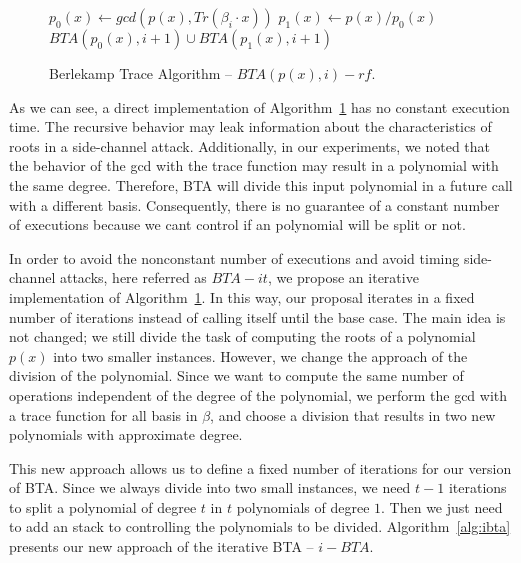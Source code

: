 \begin{figure}[ht]
\begin{algorithm}[H]
    $p_{0}(x) \gets gcd(p(x), Tr(\beta_{i}\cdot x))$\;
    $p_{1}(x) \gets p(x) / p_{0}(x)$ \;
\Return $BTA(p_{0}(x), i + 1) \cup BTA(p_{1}(x), i + 1)$\;
 \caption{Berlekamp Trace Algorithm -- $BTA(p(x), i)-rf$.}
  \label{alg:bta}
\end{algorithm}
\end{figure}

As we can see, a direct implementation of Algorithm~\ref{alg:bta} has no constant execution time. The recursive behavior may leak information about the characteristics of roots in a side-channel attack. Additionally, in our experiments, we noted that the behavior of the gcd with the trace function may result in a polynomial with the same degree. Therefore, BTA will divide this input polynomial in a future call with a different basis. Consequently, there is no guarantee of a constant number of executions because we cant control if an polynomial will be split or not. 

In order to avoid the nonconstant number of executions and avoid timing side-channel attacks, here referred as $BTA-it$, we propose an iterative implementation of Algorithm~\ref{alg:bta}. In this way, our proposal iterates in a fixed number of iterations instead of calling itself until the base case. The main idea is not changed; we still divide the task of computing the roots of a polynomial $p(x)$ into two smaller instances. However, we change the approach of the division of the polynomial. Since we want to compute the same number of operations independent of the degree of the polynomial, we perform the gcd with a trace function for all basis in $\beta$, and choose a division that results in two new polynomials with approximate degree.

This new approach allows us to define a fixed number of iterations for our version of BTA. Since we always divide into two small instances, we need $t-1$ iterations to split a polynomial of degree $t$ in $t$ polynomials of degree $1$.
Then we just need to add an stack to controlling the polynomials to be divided.
Algorithm~\ref{alg:ibta} presents our new approach of the iterative BTA -- $i-BTA$.


